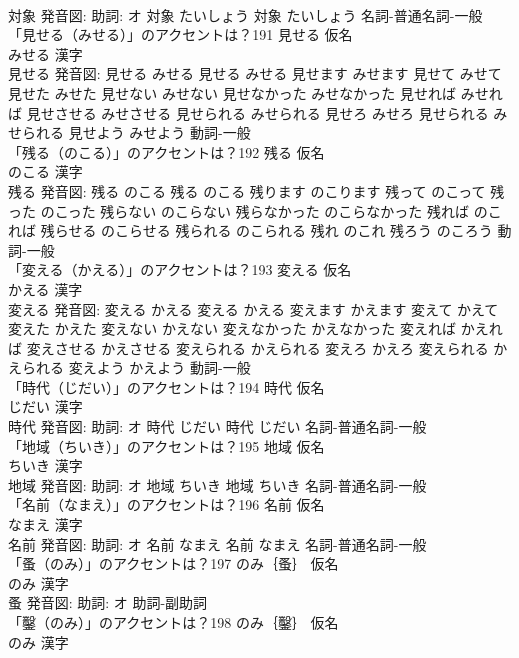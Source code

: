 \documentclass[8pt]{extreport}
\begin{document}
\begin{CJK}{UTF8}{min}
\\	対象 発音図: 助詞: オ	対象 たいしょう		対象 たいしょう				名詞-普通名詞-一般 
\\	「見せる（みせる）」のアクセントは？191	見せる 仮名　
\\	みせる 漢字　
\\	見せる 発音図:	見せる みせる		見せる みせる 見せます みせます 見せて みせて 見せた みせた 見せない みせない 見せなかった みせなかった 見せれば みせれば 見せさせる みせさせる 見せられる みせられる 見せろ みせろ 見せられる みせられる 見せよう みせよう				動詞-一般 
\\	「残る（のこる）」のアクセントは？192	残る 仮名　
\\	のこる 漢字　
\\	残る 発音図:	残る のこる		残る のこる 残ります のこります 残って のこって 残った のこった 残らない のこらない 残らなかった のこらなかった 残れば のこれば 残らせる のこらせる 残られる のこられる 残れ のこれ 残ろう のころう				動詞-一般 
\\	「変える（かえる）」のアクセントは？193	変える 仮名　
\\	かえる 漢字　
\\	変える 発音図:	変える かえる		変える かえる 変えます かえます 変えて かえて 変えた かえた 変えない かえない 変えなかった かえなかった 変えれば かえれば 変えさせる かえさせる 変えられる かえられる 変えろ かえろ 変えられる かえられる 変えよう かえよう				動詞-一般 
\\	「時代（じだい）」のアクセントは？194	時代 仮名　
\\	じだい 漢字　
\\	時代 発音図: 助詞: オ	時代 じだい		時代 じだい				名詞-普通名詞-一般 
\\	「地域（ちいき）」のアクセントは？195	地域 仮名　
\\	ちいき 漢字　
\\	地域 発音図: 助詞: オ	地域 ちいき		地域 ちいき				名詞-普通名詞-一般 
\\	「名前（なまえ）」のアクセントは？196	名前 仮名　
\\	なまえ 漢字　
\\	名前 発音図: 助詞: オ	名前 なまえ		名前 なまえ				名詞-普通名詞-一般 
\\	「蚤（のみ）」のアクセントは？197	のみ｛蚤｝ 仮名　
\\	のみ 漢字　
\\	蚤 発音図: 助詞: オ							助詞-副助詞 
\\	「鑿（のみ）」のアクセントは？198	のみ｛鑿｝ 仮名　
\\	のみ 漢字　

\end{CJK}
\end{document}
